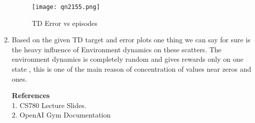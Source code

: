 \documentclass[a4 paper]{article}
\begin{document}
\begin{enumerate}
\begin{figure}[h!]
    \centering
    \texttt{[image: qn2155.png]}
    \caption{  TD Error vs episodes }
\end{figure}
\item Based on the given TD target and error plots one thing we can say for sure is the heavy influence of Environment dynamics on these scatters. The environment dynamics is completely random and gives rewards only on one state , this is one of the main reason of concentration of values near zeros and ones. 

\newpage

\textbf{References }
\\
1. CS780 Lecture Slides.\\
2. OpenAI Gym Documentation










\end{enumerate}
\end{document}
